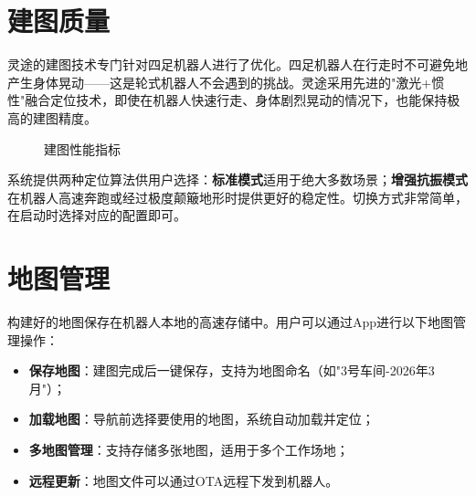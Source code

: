 \documentclass[a4paper, 12pt, openany]{book}
\begin{document}
\section{建图质量}

灵途的建图技术专门针对四足机器人进行了优化。四足机器人在行走时不可避免地产生身体晃动——这是轮式机器人不会遇到的挑战。灵途采用先进的"激光+惯性"融合定位技术，即使在机器人快速行走、身体剧烈晃动的情况下，也能保持极高的建图精度。

\begin{figure}[!htb]
\centering
{}
\caption{建图性能指标}
\end{figure}

系统提供两种定位算法供用户选择：\textbf{标准模式}适用于绝大多数场景；\textbf{增强抗振模式}在机器人高速奔跑或经过极度颠簸地形时提供更好的稳定性。切换方式非常简单，在启动时选择对应的配置即可。

\section{地图管理}

构建好的地图保存在机器人本地的高速存储中。用户可以通过App进行以下地图管理操作：

\begin{itemize}[leftmargin=2em, itemsep=4pt]
  \item \textbf{保存地图}：建图完成后一键保存，支持为地图命名（如"3号车间-2026年3月"）；
  \item \textbf{加载地图}：导航前选择要使用的地图，系统自动加载并定位；
  \item \textbf{多地图管理}：支持存储多张地图，适用于多个工作场地；
  \item \textbf{远程更新}：地图文件可以通过OTA远程下发到机器人。
\end{itemize}
\end{document}
